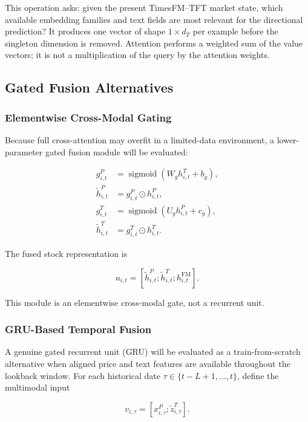 \documentclass[11pt]{article}
\newcommand{\sigmoid}{\operatorname{sigmoid}}
\begin{document}
This operation asks: given the present TimesFM--TFT market state, which
available embedding families and text fields are most relevant for the
directional prediction? It produces one vector of shape $1\times d_T$ per
example before the singleton dimension is removed. Attention performs a
weighted sum of the value vectors; it is not a multiplication of the query by
the attention weights.

\subsection{Gated Fusion Alternatives}

\subsubsection{Elementwise Cross-Modal Gating}

Because full cross-attention may overfit in a limited-data environment, a
lower-parameter gated fusion module will be evaluated:

\begin{align}
g^P_{i,t}
&=
\sigmoid
\left(
W_g h^T_{i,t}+b_g
\right),\\
\widetilde h^P_{i,t}
&=
g^P_{i,t}
\odot
h^P_{i,t},\\
g^T_{i,t}
&=
\sigmoid
\left(
U_g h^P_{i,t}+c_g
\right),\\
\widetilde h^T_{i,t}
&=
g^T_{i,t}
\odot
h^T_{i,t}.
\end{align}

The fused stock representation is

\begin{equation}
u_{i,t}
=
\left[
\widetilde h^P_{i,t};
\widetilde h^T_{i,t};
h^{\mathrm{FM}}_{i,t}
\right].
\end{equation}

This module is an elementwise cross-modal gate, not a recurrent unit.

\subsubsection{GRU-Based Temporal Fusion}

A genuine gated recurrent unit (GRU) will be evaluated as a train-from-scratch
alternative when aligned price and text features are available throughout the
lookback window. For each historical date
$\tau\in\{t-L+1,\ldots,t\}$, define the multimodal input

\begin{equation}
v_{i,\tau}
=
\left[
x^P_{i,\tau};
\widetilde z^T_{i,\tau}
\right].
\end{equation}
\end{document}
